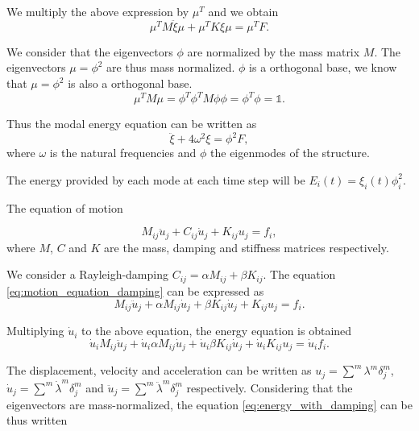\documentclass[12pt, letterpaper]{article}
\begin{document}
We multiply the above expression by $\mu^T$ and we obtain
\begin{equation}
    \mu^T M \ddot{\xi} \mu + \mu^T K \xi \mu = \mu^T F. 
\end{equation}

We consider that the eigenvectors $\phi$ are normalized by the mass matrix $M$. The eigenvectors $\mu = \phi^2$ are thus mass normalized. $\phi$ is a orthogonal base, we know that $\mu = \phi^2$ is also a orthogonal base. 
\begin{equation}
    \mu^T M \mu = \phi^T \phi^T M \phi \phi = \phi^T \phi = \mathbb{1}.
\end{equation}

Thus the modal energy equation can be written as
\begin{equation}
    \ddot{\xi} + 4 \omega^2 \xi = \phi^2 F,
\end{equation}
where $\omega$ is the natural frequencies and $\phi$ the eigenmodes of the structure. \newline

The energy provided by each mode at each time step will be $E_i(t) = \xi_i(t) \phi_i^2$. 

\newpage

The equation of motion

\begin{equation}
    M_{ij} \ddot{u}_j + C_{ij} \dot{u}_j + K_{ij}u_j = f_i,
    \label{eq:motion_equation_damping}
\end{equation}
where $M$, $C$ and $K$ are the mass, damping and stiffness matrices respectively.\newline

We consider a Rayleigh-damping $C_{ij} = \alpha M_{ij} + \beta K_{ij}$. The equation \ref{eq:motion_equation_damping} can be expressed as
\begin{equation}
    M_{ij} \ddot{u}_j + \alpha M_{ij} \dot{u}_j + \beta K_{ij} \dot{u}_j + K_{ij}u_j = f_i.
\end{equation}

Multiplying $\dot{u}_i$ to the above equation, the energy equation is obtained
\begin{equation}  
    \dot{u}_i M_{ij} \ddot{u}_j + \dot{u}_i \alpha M_{ij} \dot{u}_j + \dot{u}_i \beta K_{ij} \dot{u}_j + \dot{u}_i K_{ij}u_j = \dot{u}_i f_i.
\label{eq:energy_with_damping}
\end{equation}

The displacement, velocity and acceleration can be written as $u_j = \sum^m \lambda^m \delta_j^m$, $\dot{u}_j = \sum^m \dot{\lambda}^m \delta_j^m$ and $\ddot{u}_j = \sum^m \ddot{\lambda}^m \delta_j^m$ respectively. Considering that the eigenvectors are mass-normalized, the equation \ref{eq:energy_with_damping} can be thus written 
\end{document}
